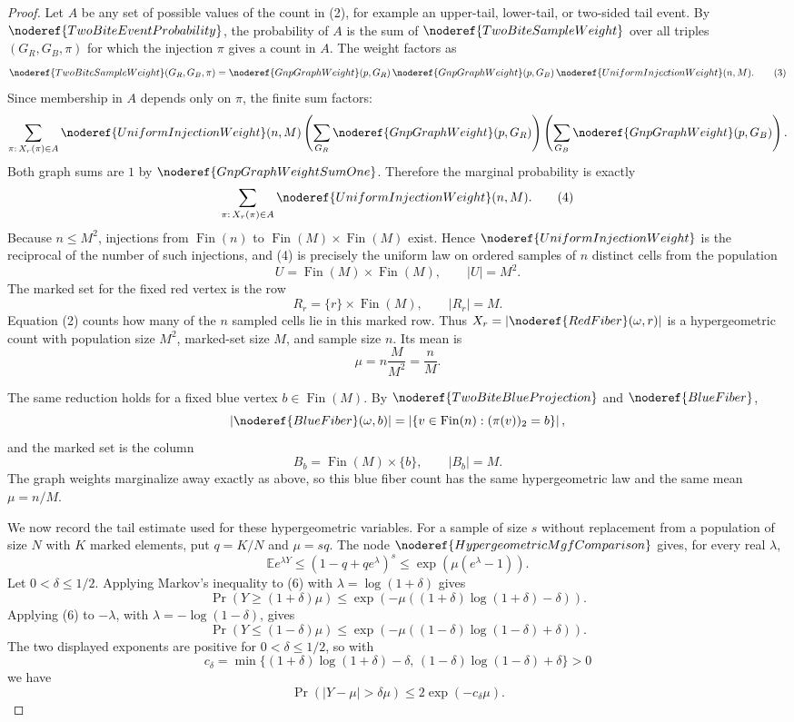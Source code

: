 \begin{proof}
Let \(A\) be any set of possible values of the count in (2), for example an
upper-tail, lower-tail, or two-sided tail event.  By
\(\noderef{TwoBiteEventProbability}\), the probability of \(A\) is the sum of
\(\noderef{TwoBiteSampleWeight}\) over all triples
\((G_R,G_B,\pi)\) for which the injection \(\pi\) gives a count in \(A\).
The weight factors as
\[
\noderef{TwoBiteSampleWeight}(G_R,G_B,\pi)
=\noderef{GnpGraphWeight}(p,G_R)\,
  \noderef{GnpGraphWeight}(p,G_B)\,
  \noderef{UniformInjectionWeight}(n,M).
\tag{3}
\]
Since membership in \(A\) depends only on \(\pi\), the finite sum factors:
\[
\sum_{\pi:\,X_r(\pi)\in A}\noderef{UniformInjectionWeight}(n,M)
\left(\sum_{G_R}\noderef{GnpGraphWeight}(p,G_R)\right)
\left(\sum_{G_B}\noderef{GnpGraphWeight}(p,G_B)\right).
\]
Both graph sums are \(1\) by \(\noderef{GnpGraphWeightSumOne}\).  Therefore
the marginal probability is exactly
\[
\sum_{\pi:\,X_r(\pi)\in A}\noderef{UniformInjectionWeight}(n,M).
\tag{4}
\]
Because \(n\le M^2\), injections from \(\operatorname{Fin}(n)\) to
\(\operatorname{Fin}(M)\times\operatorname{Fin}(M)\) exist.  Hence
\(\noderef{UniformInjectionWeight}\) is the reciprocal of the number of such
injections, and (4) is precisely the uniform law on ordered samples of \(n\)
distinct cells from the population
\[
U=\operatorname{Fin}(M)\times\operatorname{Fin}(M),\qquad |U|=M^2.
\]
The marked set for the fixed red vertex is the row
\[
R_r=\{r\}\times\operatorname{Fin}(M),
\qquad |R_r|=M.
\]
Equation (2) counts how many of the \(n\) sampled cells lie in this marked
row.  Thus \(X_r=|\noderef{RedFiber}(\omega,r)|\) is a hypergeometric count
with population size \(M^2\), marked-set size \(M\), and sample size \(n\).
Its mean is
\[
\mu=n\frac{M}{M^2}=\frac nM.
\tag{5}
\]

The same reduction holds for a fixed blue vertex
\(b\in \operatorname{Fin}(M)\).  By \(\noderef{TwoBiteBlueProjection}\) and
\(\noderef{BlueFiber}\),
\[
|\noderef{BlueFiber}(\omega,b)|
=\left|\{v\in \operatorname{Fin}(n):(\pi(v))_2=b\}\right|,
\]
and the marked set is the column
\[
B_b=\operatorname{Fin}(M)\times\{b\},
\qquad |B_b|=M.
\]
The graph weights marginalize away exactly as above, so this blue fiber count
has the same hypergeometric law and the same mean \(\mu=n/M\).

We now record the tail estimate used for these hypergeometric variables.
For a sample of size \(s\) without replacement from a population of size
\(N\) with \(K\) marked elements, put \(q=K/N\) and \(\mu=sq\).  The node
\(\noderef{HypergeometricMgfComparison}\) gives, for every real
\(\lambda\),
\[
\mathbb E e^{\lambda Y}
\le (1-q+qe^\lambda)^s
\le \exp(\mu(e^\lambda-1)).
\tag{6}
\]
Let \(0<\delta\le 1/2\).  Applying Markov's inequality to (6) with
\(\lambda=\log(1+\delta)\) gives
\[
\Pr(Y\ge(1+\delta)\mu)
\le \exp\!\left(-\mu((1+\delta)\log(1+\delta)-\delta)\right).
\]
Applying (6) to \(-\lambda\), with
\(\lambda=-\log(1-\delta)\), gives
\[
\Pr(Y\le(1-\delta)\mu)
\le \exp\!\left(-\mu((1-\delta)\log(1-\delta)+\delta)\right).
\]
The two displayed exponents are positive for \(0<\delta\le1/2\), so with
\[
c_\delta=\min\{(1+\delta)\log(1+\delta)-\delta,\,
                (1-\delta)\log(1-\delta)+\delta\}>0
\]
we have
\[
\Pr(|Y-\mu|>\delta\mu)\le 2\exp(-c_\delta\mu).
\tag{7}
\]


\end{proof}
